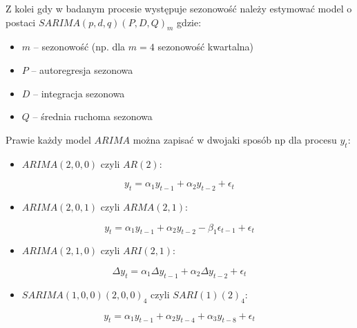 \documentclass[polish,]{book}
\providecommand{\tightlist}{%
  \setlength{\itemsep}{0pt}\setlength{\parskip}{0pt}}
\begin{document}
Z kolei gdy w badanym procesie występuje sezonowość należy estymować model o
postaci \(SARIMA(p, d, q)(P, D, Q)_m\) gdzie:

\begin{itemize}
\item
  \(m\) -- sezonowość (np. dla \(m = 4\) sezonowość kwartalna)
\item
  \(P\) -- autoregresja sezonowa
\item
  \(D\) -- integracja sezonowa
\item
  \(Q\) -- średnia ruchoma sezonowa
\end{itemize}

Prawie każdy model \(ARIMA\) można zapisać w dwojaki sposób np dla procesu \(y_t\):

\begin{itemize}
\tightlist
\item
  \(ARIMA(2,0,0)\) czyli \(AR(2)\):
\end{itemize}

\begin{equation}
y_t= \alpha_1 y_{t-1}+\alpha_2 y_{t-2}+\epsilon_t
\label{eq:ar01}
\end{equation}

\begin{itemize}
\tightlist
\item
  \(ARIMA(2,0,1)\) czyli \(ARMA(2,1)\):
\end{itemize}

\begin{equation}
y_t= \alpha_1 y_{t-1}+\alpha_2 y_{t-2}-\beta_1 \epsilon_{t-1}+\epsilon_t
\label{eq:ar02}
\end{equation}

\begin{itemize}
\tightlist
\item
  \(ARIMA(2,1,0)\) czyli \(ARI(2,1)\):
\end{itemize}

\begin{equation}
\Delta y_t= \alpha_1\Delta y_{t-1}+\alpha_2\Delta y_{t-2} +\epsilon_t
\label{eq:ar03}
\end{equation}

\begin{itemize}
\tightlist
\item
  \(SARIMA(1,0,0)(2,0,0)_4\) czyli \(SARI(1)(2)_4\):
\end{itemize}

\begin{equation}
y_t= \alpha_1 y_{t-1}+\alpha_2 y_{t-4}+\alpha_3 y_{t-8} +\epsilon_t
\label{eq:ar04}
\end{equation}
\end{document}
